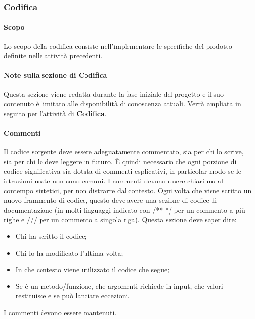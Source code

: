 \subsubsection{Codifica}
\paragraph{Scopo}
Lo scopo della codifica consiste nell'implementare le specifiche del prodotto definite nelle attività precedenti.

\paragraph{Note sulla sezione di Codifica}
Questa sezione viene redatta durante la fase iniziale del progetto e il suo contenuto è limitato alle disponibilità di conoscenza attuali.
Verrà ampliata in seguito per l'attività di \textbf{Codifica}.

\paragraph{Commenti}
Il codice sorgente deve essere adeguatamente commentato, sia per chi lo scrive, sia per chi lo deve leggere in futuro.
È quindi necessario che ogni porzione di codice significativa sia dotata di commenti esplicativi, in particolar modo se le istruzioni usate non sono comuni.
I commenti devono essere chiari ma al contempo sintetici, per non distrarre dal contesto.
Ogni volta che viene scritto un nuovo frammento di codice, questo deve avere una sezione di codice di documentazione (in molti linguaggi indicato con /** */ per un commento a più righe e /// per un commento a singola riga).
Questa sezione deve saper dire:
\begin{itemize}
    \item Chi ha scritto il codice;
    \item Chi lo ha modificato l'ultima volta;
    \item In che contesto viene utilizzato il codice che segue;
    \item Se è un metodo/funzione, che argomenti richiede in input, che valori restituisce e se può lanciare eccezioni.
\end{itemize}
I commenti devono essere mantenuti.

